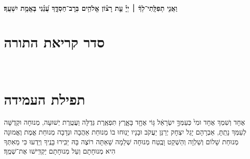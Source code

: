 \documentclass[twoside, openany, parskip=half, 11pt]{book}
\begin{document}
\ashrei

\uvaletzion

\halfkaddish


\textbf{
וַאֲנִ֤י תְפִלָּֽתִי־לְךָ֨ ׀ יְיָ֡ עֵ֤ת רָצ֗וֹן אֱלֹהִ֥ים בְּרׇב־חַסְדֶּ֑ךָ עֲ֝נֵ֗נִי בֶּאֱמֶ֥ת יִשְׁעֶֽךָ׃ } 

\section[סדר קריאת התורה]{ סדר קריאת התורה }


\pesicha

\brikhshmei

\gadlu

\avharachamim

\vesigale


\torahbarachu

\hagomel

\nextpage
\hagbaha

\yehalelu

\\
\kafdalet

\nextpage
\etzchaim

\label{shabYTamidah}
\halfkaddish

\section[תפילת העמידה]{ תפילת העמידה }


\amidaopening{\shabbosshuva}{}

\weekdaysakedusha

\sepline


אֶחָד וְשִׁמְךָ אֶחָד וּמִי֙ כְּעַמְּךָ֣ יִשְׂרָאֵ֔ל גּ֥וֹי אֶחָ֖ד בָּאָ֑רֶץ תִּפְאֶֽרֶת גְּדֻלָּה וַעֲטֶֽרֶת יְשׁוּעָה, מְנוּחָה וּקְדֻשָּׁה לְעַמְּךָ נָתַֽתָּ, אַבְרָהָם יָגֵל יִצְחָק יְרַנֵּן יַעֲקֹב וּבָנָיו יָנֽוּחוּ בוֹ מְנוּחַת אַהֲבָה וּנְדָבָה מְנוּחַת אֱמֶת וֶאֱמוּנָה מְנוּחַת שָׁלוֹם וְשַׁלְוָה וְהַשְׁקֵט וָבֶֽטַח מְנוּחָה שְׁלֵמָה שָׁאַתָּה רוֹצֶה בָּהּ יַכִּֽירוּ בָנֶֽיךָ וְיֵדְעוּ כִּי מֵאִתְּךָ הִיא מְנוּחָתָם וְעַל מְנוּחָתָם יַקְדִּֽישׁוּ אֶת־שְׁמֶֽךָ׃
\end{document}

